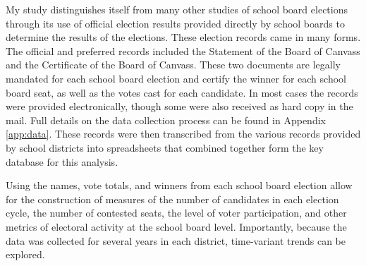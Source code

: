My study distinguishes itself from many other studies of school board elections through 
its use of official election results provided directly by school boards to determine 
the results of the elections. These election records came in many forms. The official and preferred 
records included the Statement of the Board of Canvass and the Certificate of the 
Board of Canvass. These two documents are legally mandated for each school board 
election and certify the winner for each school board seat, as well as the votes 
cast for each candidate. In most cases the records were provided electronically, 
though some were also received as hard copy in the mail. Full details on the data 
collection process can be found in Appendix \ref{app:data}. 
These records were then transcribed from the various records provided by school 
districts into spreadsheets that combined together form the key database for this 
analysis. 

Using the names, vote totals, and winners from each school board election allow 
for the construction of measures of the number of candidates in each election 
cycle, the number of contested seats, the level of voter participation, and other 
metrics of electoral activity at the school board level. Importantly, because the 
data was collected for several years in each district, time-variant trends can be 
explored. 

